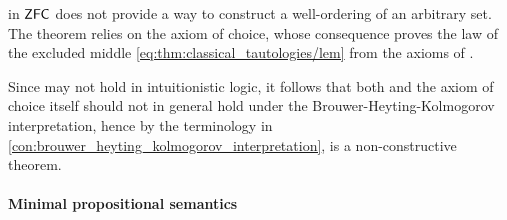 \begin{example}\label{ex:con:brouwer_heyting_kolmogorov_interpretation/well_ordering_principle_zfc}
   in \hyperref[def:zfc]{\( \textsf{ZFC} \)} does not provide a way to construct a well-ordering of an arbitrary set. The theorem relies on the axiom of choice, whose consequence  proves the law of the excluded middle \eqref{eq:thm:classical_tautologies/lem} from the axioms of .

  Since  may not hold in intuitionistic logic, it follows that both  and the axiom of choice itself should not in general hold under the Brouwer-Heyting-Kolmogorov interpretation, hence by the terminology in \cref{con:brouwer_heyting_kolmogorov_interpretation},  is a non-constructive theorem.
\end{example}

\paragraph{Minimal propositional semantics}

